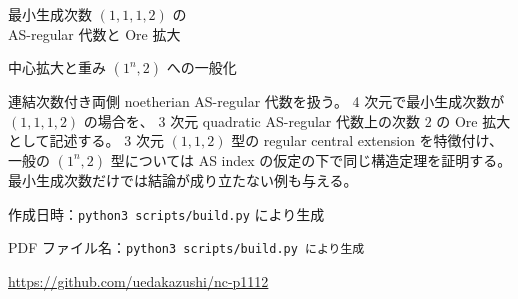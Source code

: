 \documentclass[a4paper,11pt]{article}
\numberwithin{equation}{section}
\theoremstyle{definition}
\newcommand{\BuildTimestamp}{\texttt{python3 scripts/build.py} により生成}
\newcommand{\BuildFilename}{\texttt{python3 scripts/build.py} により生成}}
\begin{document}
\begin{titlepage}
\centering
\vspace*{30mm}
{\LARGE 最小生成次数 \((1,1,1,2)\) の\\[3mm]
AS-regular 代数と Ore 拡大\par}
\vspace{10mm}
{\large 中心拡大と重み \((1^n,2)\) への一般化\par}
\vspace{20mm}
\begin{minipage}{0.85\textwidth}
連結次数付き両側 noetherian AS-regular 代数を扱う。
4 次元で最小生成次数が \((1,1,1,2)\) の場合を、
3 次元 quadratic AS-regular 代数上の次数 \(2\) の Ore 拡大として記述する。
3 次元 \((1,1,2)\) 型の regular central extension を特徴付け、
一般の \((1^n,2)\) 型については AS index の仮定の下で同じ構造定理を証明する。
最小生成次数だけでは結論が成り立たない例も与える。
\end{minipage}
\vfill
{\small 作成日時：\BuildTimestamp\par}
\vspace{3mm}
{\small PDF ファイル名：\texttt{\BuildFilename}\par}
\vspace{8mm}
{\small \url{https://github.com/uedakazushi/nc-p1112}\par}
\end{titlepage}
\tableofcontents
\clearpage






\end{document}
